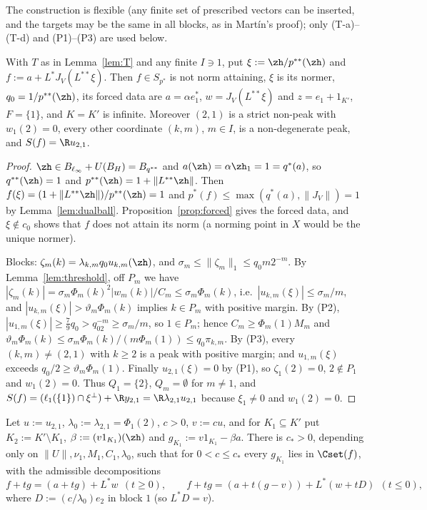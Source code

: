 The construction is flexible (any finite set of prescribed vectors can be
inserted, and the targets may be the same in all blocks, as in Mart\'in's
proof); only (T-a)--(T-d) and (P1)--(P3) are used below.

\begin{lemma}\label{lem:firstrow}
With $T$ as in Lemma~\ref{lem:T} and any finite $I\ni1$, put
$\xi:=\zh/p^{**}(\zh)$ and $f:=a+L^*J_V(L^{**}\xi)$.  Then $f\in S_{p^*}$ is
not norm attaining, $\xi$ is its normer, $q_0=1/p^{**}(\zh)$, its forced data
are $a=\alpha e_1^*$, $w=J_V(L^{**}\xi)$ and $z=e_1+1_{K'}$, $F=\{1\}$, and
$K=K'$ is infinite.  Moreover $(2,1)$ is a strict non-peak with $w_1(2)=0$,
every other coordinate $(k,m)$, $m\in I$, is a non-degenerate peak, and
$S(f)=\R u_{2,1}$.
\end{lemma}

\begin{proof}
$\zh\in B_{\ell_\infty}+U(B_H)=B_{q^{**}}$ and $a(\zh)=\alpha\zh_1=1=q^*(a)$,
so $q^{**}(\zh)=1$ and $p^{**}(\zh)=1+\|L^{**}\zh\|$.  Then
$f(\xi)=(1+\|L^{**}\zh\|)/p^{**}(\zh)=1$ and $p^*(f)\le\max(q^*(a),\|J_V\|)
=1$ by Lemma~\ref{lem:dualball}.  Proposition~\ref{prop:forced} gives the
forced data, and $\xi\notin c_0$ shows that $f$ does not attain its norm
(a norming point in $X$ would be the unique normer).

Blocks: $\zeta_m(k)=\lambda_{k,m}q_0u_{k,m}(\zh)$, and
$\sigma_m\le\|\zeta_m\|_1\le q_0m2^{-m}$.  By Lemma~\ref{lem:threshold},
off $P_m$ we have $|\zeta_m(k)|=\sigma_m\Phi_m(k)^2|w_m(k)|/C_m\le\sigma_m
\Phi_m(k)$, i.e.\ $|u_{k,m}(\xi)|\le\sigma_m/m$, and
$|u_{k,m}(\xi)|>\vartheta_m\Phi_m(k)$ implies $k\in P_m$ with positive
margin.  By (P2), $|u_{1,m}(\xi)|\ge\frac79q_0>q_02^{-m}\ge\sigma_m/m$, so
$1\in P_m$; hence $C_m\ge\Phi_m(1)M_m$ and
$\vartheta_m\Phi_m(k)\le\sigma_m\Phi_m(k)/(m\Phi_m(1))\le q_0\pi_{k,m}$.  By
(P3), every $(k,m)\ne(2,1)$ with $k\ge2$ is a peak with positive margin; and
$u_{1,m}(\xi)$ exceeds $q_0/2\ge\vartheta_m\Phi_m(1)$.  Finally
$u_{2,1}(\xi)=0$ by (P1), so $\zeta_1(2)=0$, $2\notin P_1$ and
$w_1(2)=0$.  Thus $Q_1=\{2\}$, $Q_m=\emptyset$ for $m\ne1$, and
$S(f)=(\ell_1(\{1\})\cap\xi^\perp)+\R y_{2,1}=\R\lambda_{2,1}u_{2,1}$
because $\xi_1\ne0$ and $w_1(2)=0$.
\end{proof}

\begin{proposition}\label{prop:twopiece}
Let $u:=u_{2,1}$, $\lambda_0:=\lambda_{2,1}=\Phi_1(2)$, $c>0$, $v:=cu$, and for
$K_1\subseteq K'$ put $K_2:=K'\setminus K_1$,
$\beta:=(v1_{K_1})(\zh)$ and $g_{K_1}:=v1_{K_1}-\beta a$.  There is $c_*>0$,
depending only on $\|U\|,\nu_1,M_1,C_1,\lambda_0$, such that for $0<c\le c_*$
every $g_{K_1}$ lies in $\Cset(f)$, with the admissible decompositions
\[
 f+tg=(a+tg)+L^*w\ \ (t\ge0),\qquad
 f+tg=(a+t(g-v))+L^*(w+tD)\ \ (t\le0),
\]
where $D:=(c/\lambda_0)e_2$ in block $1$ \textup{(}so $L^*D=v$\textup{)}.
\end{proposition}

